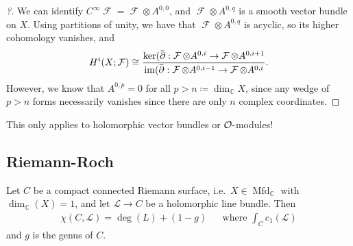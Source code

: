 \begin{proof}[?]

We can identify
\(C^{\infty }\operatorname{\mathcal{F}} = \operatorname{\mathcal{F}} \otimes A^{0, 0}\),
and \(\operatorname{\mathcal{F}} \otimes A^{0, q}\) is a smooth vector
bundle on \(X\). Using partitions of unity, we have that
\(\operatorname{\mathcal{F}} \otimes A^{0, q}\) is acyclic, so its
higher cohomology vanishes, and
\begin{align*}
H^i(X; \operatorname{\mathcal{F}} ) \cong 
\frac
{ \ker ( \mkern 1.5mu\overline{\mkern-1.5mu{\partial}\mkern-1.5mu}\mkern 1.5mu: \operatorname{\mathcal{F}}\otimes A^{0, i} \to \operatorname{\mathcal{F}} \otimes A^{0, i+1} }
{ \operatorname{im}( \mkern 1.5mu\overline{\mkern-1.5mu{\partial}\mkern-1.5mu}\mkern 1.5mu: \operatorname{\mathcal{F}}\otimes A^{0, i-1} \to \operatorname{\mathcal{F}} \otimes A^{0, i} }
.\end{align*}
However, we know that \(A^{0, p} = 0\) for all
\(p> n \coloneqq\dim_{\mathbb{C}}X\), since any wedge of \(p>n\) forms
necessarily vanishes since there are only \(n\) complex coordinates.

\end{proof}

\begin{warnings}

This only applies to holomorphic vector bundles or
\({\mathcal{O}}{\hbox{-}}\)modules!

\end{warnings}

\hypertarget{riemann-roch}{%
\subsection{Riemann-Roch}\label{riemann-roch}}

\begin{theorem}

Let \(C\) be a compact connected Riemann surface,
i.e.~\(X\in {\operatorname{Mfd}}_{\mathbb{C}}\) with
\(\dim_{\mathbb{C}}(X) = 1\), and let \(\mathcal{L}\to C\) be a
holomorphic line bundle. Then
\begin{align*}
\chi(C, \mathcal{L}) = \deg(L) + (1-g) && \text{where } \int_C c_1(\mathcal{L})
\end{align*}
and \(g\) is the genus of \(C\).

\end{theorem}

